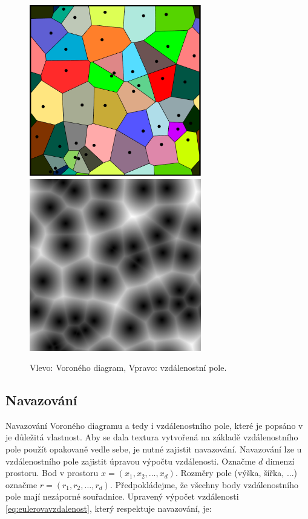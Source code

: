 \begin{figure}[h]
\centering
\includegraphics[width=7.5cm,keepaspectratio]{obr/voronoid.pdf}
\includegraphics[width=7.5cm,keepaspectratio]{obr/vzdalenostni_pole.jpg}
\caption{Vlevo: Voroného diagram, Vpravo: vzdálenostní pole.}
\label{fig:voronoid}
\end{figure}

\subsection{Navazování}
Navazování Voroného diagramu a tedy i vzdálenostního pole, které je popsáno v \cite{VOROWEB} je důležitá vlastnost.
Aby se dala textura vytvořená na základě vzdálenostního pole použít opakovaně vedle sebe, je nutné zajistit navazování.
Navazování lze u vzdálenostního pole zajistit úpravou výpočtu vzdálenosti.
Označme $d$ dimenzí prostoru.
Bod v prostoru $x=(x_1,x_2,\dotsc,x_d)$.
Rozměry pole (výška, šířka, ...) označme $r=(r_1,r_2,\dotsc,r_d)$.
Předpokládejme, že všechny body vzdálenostního pole mají nezáporné souřadnice.
Upravený výpočet vzdá\-le\-nos\-ti \ref{eq:eulerovavzdalenost}, který respektuje navazování, je:

